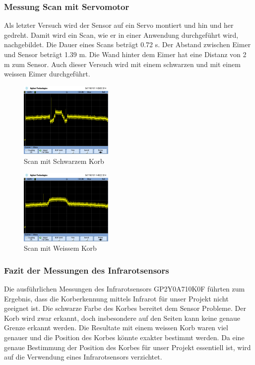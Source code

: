 \subsubsection{Messung Scan mit Servomotor}
Als letzter Versuch wird der Sensor auf ein Servo montiert und hin und her 
gedreht. Damit wird ein Scan, wie er in einer Anwendung durchgeführt wird, 
nachgebildet. Die Dauer eines Scans beträgt 0.72 s. Der Abstand zwischen 
Eimer und Sensor beträgt 1.39 m. Die Wand hinter dem Eimer hat eine Distanz 
von 2 m zum Sensor. Auch dieser Versuch wird mit einem schwarzen und mit einem 
weissen Eimer durchgeführt. 
\begin{figure}[h!]
    \centering
    \includegraphics[width=0.4\textwidth]{fig/scope_80.png}
    \caption{Scan mit Schwarzem Korb}
    \label{fig:scan_ir_black}
\end{figure}
\begin{figure}[h!]
    \centering
    \includegraphics[width=0.4\textwidth]{fig/scope_82.png}
    \caption{Scan mit Weissem Korb}
    \label{fig:scan_ir_white}
\end{figure}
\subsubsection{Fazit der Messungen des Infrarotsensors}
Die ausführlichen Messungen des Infrarotsensors GP2Y0A710K0F führten zum Ergebnis, dass die Korberkennung mittels Infrarot für unser Projekt nicht geeignet ist. Die schwarze Farbe des Korbes bereitet dem Sensor Probleme. Der Korb wird zwar erkannt, doch insbesondere auf den Seiten kann keine genaue Grenze erkannt werden. Die Resultate mit einem weissen Korb waren viel genauer und die Position des Korbes könnte exakter bestimmt werden. Da eine genaue Bestimmung der Position des Korbes für unser Projekt essentiell ist, wird auf die Verwendung eines Infrarotsensors verzichtet.

